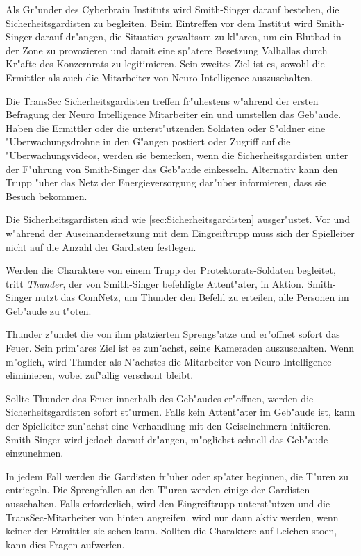 Als Gr"under des Cyberbrain Instituts wird Smith-Singer darauf bestehen, die Sicherheitsgardisten zu begleiten. Beim Eintreffen vor dem Institut wird Smith-Singer darauf dr"angen, die Situation gewaltsam zu kl"aren, um ein Blutbad in der Zone zu provozieren und damit eine sp"atere Besetzung Valhallas durch Kr"afte des Konzernrats zu legitimieren. Sein zweites Ziel ist es, sowohl die Ermittler als auch die Mitarbeiter von Neuro Intelligence auszuschalten.

Die TransSec Sicherheitsgardisten treffen fr"uhestens w"ahrend der ersten Befragung der Neuro Intelligence Mitarbeiter ein und umstellen das Geb"aude. Haben die Ermittler oder die unterst"utzenden Soldaten oder S"oldner eine "Uberwachungsdrohne in den G"angen postiert oder Zugriff auf die "Uberwachungsvideos, werden sie bemerken, wenn die Sicherheitsgardisten unter der F"uhrung von Smith-Singer das Geb"aude einkesseln. Alternativ kann \xl{} den Trupp "uber das Netz der Energieversorgung dar"uber informieren, dass sie Besuch bekommen.

Die Sicherheitsgardisten sind wie \cref{sec:Sicherheitsgardisten} ausger"ustet. Vor und w"ahrend der Auseinandersetzung mit dem Eingreiftrupp muss sich der Spielleiter nicht auf die Anzahl der Gardisten festlegen.

Werden die Charaktere von einem Trupp der Protektorats-Soldaten begleitet, tritt \emph{Thunder}, der von Smith-Singer befehligte Attent"ater, in Aktion. Smith-Singer nutzt das ComNetz, um Thunder den Befehl zu erteilen, alle Personen im Geb"aude zu t"oten.

Thunder z"undet die von ihm platzierten Sprengs"atze und er"offnet sofort das Feuer. Sein prim"ares Ziel ist es zun"achst, seine Kameraden auszuschalten. Wenn m"oglich, wird Thunder als N"achstes die Mitarbeiter von Neuro Intelligence eliminieren, wobei \ml{} zuf"allig verschont bleibt.

Sollte Thunder das Feuer innerhalb des Geb"audes er"offnen, werden die Sicherheitsgardisten sofort st"urmen. Falls kein Attent"ater im Geb"aude ist, kann der Spielleiter zun"achst eine Verhandlung mit den Geiselnehmern initiieren. Smith-Singer wird jedoch darauf dr"angen, m"oglichst schnell das Geb"aude einzunehmen.

In jedem Fall werden die Gardisten fr"uher oder sp"ater beginnen, die T"uren zu entriegeln. Die Sprengfallen an den T"uren werden einige der Gardisten ausschalten. Falls erforderlich, wird \xl{} den Eingreiftrupp unterst"utzen und die TransSec-Mitarbeiter von hinten angreifen. \xl{} wird nur dann aktiv werden, wenn keiner der Ermittler sie sehen kann. Sollten die Charaktere auf Leichen sto\3en, kann dies Fragen aufwerfen.

